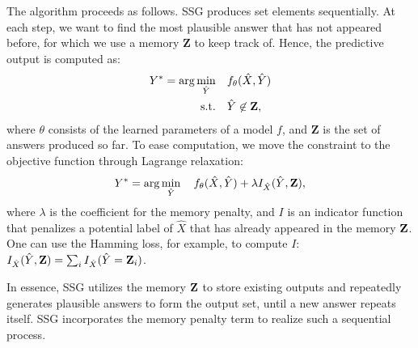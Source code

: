 \documentclass[letterpaper]{article} %
\begin{document}
The algorithm proceeds as follows. 
SSG produces set elements sequentially. At each step, we want to find the most plausible answer that has not appeared before, for which we use a memory $\mathbf{Z}$ to keep track of. Hence, the predictive output is computed as: 
%
\begin{alignat*}{2}
Y^* = \arg\min_{\hat{Y}} \quad & f_{\theta}(\hat{X},\hat{Y}) \\
  \text{s.t.} \quad &  \begin{aligned}[t]
     \hat{Y} & \not\in {\bf Z},\\
  \end{aligned}
\end{alignat*}
where $\theta$ consists of the learned parameters of a model $f$, and $\mathbf{Z}$ is the set of answers produced so far. To ease computation, we move the constraint to the objective function through Lagrange relaxation:
\begin{equation}
\label{eq:obj}
Y^* = \arg\min_{\hat{Y}}  \quad f_{\theta}(\hat{X},\hat{Y}) + \lambda I_{\hat{X}}(\hat{Y},{\bf Z}),
\end{equation}
where $\lambda$ is the coefficient for the memory penalty, and $I$ is an indicator function that penalizes a potential label of $\hat{X}$ that has already appeared in the memory ${\bf Z}$. One can use the Hamming loss, for example, to compute $I$: $I_{\hat{X}}(\hat{Y},{\bf Z}) = \sum_i I_{\hat{X}}(\hat{Y} = {\bf Z}_i)$.

 In essence, SSG utilizes the memory ${\bf Z}$ to store existing outputs and repeatedly generates plausible answers to form the output set, until a new answer repeats itself. SSG incorporates the memory penalty term to realize such a sequential process.
 
\end{document}
